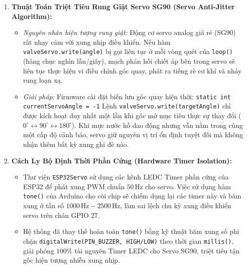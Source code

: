 \begin{enumerate}
    \item \textbf{Thuật Toán Triệt Tiêu Rung Giật Servo SG90 (Servo Anti-Jitter Algorithm):}
    \begin{itemize}
        \item \textit{Nguyên nhân hiện tượng rung giật:} Động cơ servo analog giá rẻ (SG90) rất nhạy cảm với xung nhịp điều khiển. Nếu hàm \lstinline|valveServo.write(angle)| bị gọi liên tục ở mỗi vòng quét của \lstinline|loop()| (hàng chục nghìn lần/giây), mạch phản hồi chiết áp bên trong servo sẽ liên tục thực hiện vi điều chỉnh góc quay, phát ra tiếng rè cơ khí và nhảy rung loạn xạ.
        \item \textit{Giải pháp:} Firmware cài đặt biến lưu góc quay hiện thời:
        \newline
        \lstinline|static int currentServoAngle = -1|
        \newline
        Lệnh \lstinline|valveServo.write(targetAngle)| chỉ được kích hoạt duy nhất một lần khi góc mở mục tiêu thực sự thay đổi ($0^\circ \leftrightarrow 90^\circ \leftrightarrow 180^\circ$). Khi mực nước hồ dao động nhưng vẫn nằm trong cùng một cấp độ cảnh báo, servo giữ nguyên vị trí ổn định tuyệt đối mà không nhận thêm bất kỳ xung ghi đè nào.
    \end{itemize}

    \item \textbf{Cách Ly Bộ Định Thời Phần Cứng (Hardware Timer Isolation):}
    \begin{itemize}
        \item Thư viện \lstinline|ESP32Servo| sử dụng các kênh LEDC Timer phần cứng của ESP32 để phát xung PWM chuẩn $50\,\text{Hz}$ cho servo. Việc sử dụng hàm \lstinline|tone()| của Arduino cho còi chip sẽ chiếm dụng lại các timer này và băm xung ở tần số $1000\,\text{Hz} - 2500\,\text{Hz}$, làm sai lệch chu kỳ xung điều khiển servo trên chân GPIO 27.
        \item Hệ thống đã thay thế hoàn toàn \lstinline|tone()| bằng kỹ thuật băm xung số phi chặn \lstinline|digitalWrite(PIN_BUZZER, HIGH/LOW)| theo thời gian \lstinline|millis()|, giải phóng $100\%$ tài nguyên Timer LEDC cho Servo SG90, triệt tiêu tận gốc hiện tượng nhiễu xung nhịp.
    \end{itemize}


\end{enumerate}
